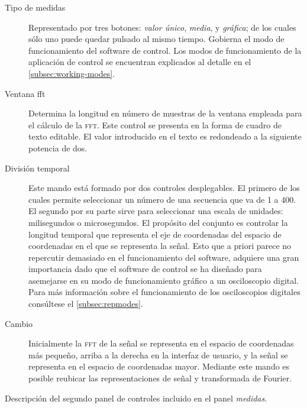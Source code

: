 \begin{table}
	\centering
	\begin{minipage}{.85\textwidth}
		\begin{description}
			\item[Tipo de medidas] Representado por tres
				botones: \emph{valor único}, \emph{media},
				y \emph{gráfica}; de los cuales sólo uno
				puede quedar pulsado al mismo tiempo.
				Gobierna el modo de funcionamiento del
				software de control. Los modos de
				funcionamiento de la aplicación de control
				se encuentran explicados al detalle en el
				\vref{subsec:working-modes}.
			\item[Ventana fft] Determina la longitud en número
				de muestras de la ventana empleada para el
				cálculo de la \textsc{fft}. Este control se
				presenta en la forma de cuadro de texto
				editable. El valor introducido en el texto
				es redondeado a la siguiente potencia de
				dos.
			\item[División temporal] Este mando está formado
				por dos controles desplegables. El primero
				de los cuales permite seleccionar un número
				de una secuencia que va de 1 a 400. El
				segundo por su parte sirve para seleccionar
				una escala de unidades: milisegundos o
				microsegundos. El propósito del conjunto es
				controlar la longitud temporal que
				representa el eje de coordenadas del
				espacio de coordenadas en el que se
				representa la señal. Esto que a priori
				parece no repercutir demasiado en el
				funcionamiento del software, adquiere una
				gran importancia dado que el software de
				control se ha diseñado para asemejarse en
				su modo de funcionamiento gráfico a un
				osciloscopio digital. Para más información
				sobre el funcionamiento de los
				osciloscopios digitales consúltese el
				\vref{subsec:repmodes}.
			\item[Cambio] Inicialmente la \textsc{fft} de la
				señal se representa en el espacio de
				coordenadas más pequeño, arriba a la
				derecha en la interfaz de usuario, y la
				señal se representa en el espacio de
				coordenadas mayor. Mediante este mando es
				posible reubicar las representaciones de
				señal y transformada de Fourier.
		\end{description}
	\end{minipage}
	\caption[Descripción del segundo panel de controles]{Descripción
	del segundo panel de controles incluido en el panel
	\emph{medidas}.}
	\label{tab:second-panel}
\end{table}

